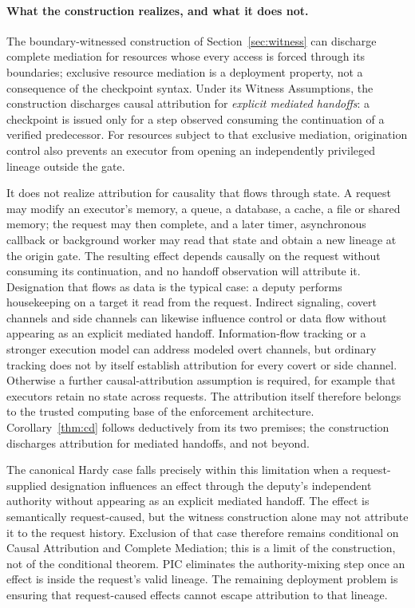 \documentclass[10pt,twocolumn]{article}
\begin{document}
\paragraph{What the construction realizes, and what it does not.}
The boundary-witnessed construction of Section~\ref{sec:witness} can discharge
complete mediation for resources whose every access is forced through its
boundaries; exclusive resource mediation is a deployment property, not a
consequence of the checkpoint syntax. Under its Witness Assumptions, the
construction discharges causal attribution for \emph{explicit mediated
handoffs}: a checkpoint is issued only for a step observed consuming the
continuation of a verified predecessor.
For resources subject to that exclusive mediation, origination control also
prevents an executor from opening an independently privileged lineage outside
the gate.

It does not realize attribution for causality that flows through state. A
request may modify an executor's memory, a queue, a database, a cache, a file
or shared memory; the request may then complete, and a later timer, asynchronous
callback or background worker may read that state and obtain a new lineage at
the origin gate. The resulting effect depends causally on the request without
consuming its continuation, and no handoff observation will attribute it.
Designation that flows as data is the typical case: a deputy performs
housekeeping on a target it read from the request. Indirect signaling, covert
channels and side channels can likewise influence control or data flow without
appearing as an explicit mediated handoff. Information-flow tracking or a
stronger execution model can address modeled overt channels, but ordinary
tracking does not by itself establish attribution for every covert or side
channel. Otherwise a further causal-attribution assumption is required, for
example that executors retain no state across requests. The attribution itself
therefore belongs to the trusted computing base of the enforcement
architecture. Corollary~\ref{thm:cd} follows deductively from its two premises;
the construction discharges attribution for mediated handoffs, and not beyond.

The canonical Hardy case falls precisely within this limitation when a
request-supplied designation influences an effect through the deputy's
independent authority without appearing as an explicit mediated handoff. The
effect is semantically request-caused, but the witness construction alone may
not attribute it to the request history. Exclusion of that case therefore
remains conditional on Causal Attribution and Complete Mediation; this is a
limit of the construction, not of the conditional theorem.
PIC eliminates the authority-mixing step once an effect is inside the request's
valid lineage. The remaining deployment problem is ensuring that
request-caused effects cannot escape attribution to that lineage.
\end{document}
